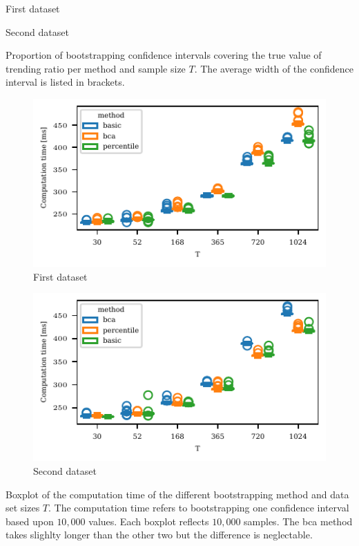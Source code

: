 \begin{table}
    \centering
    \begin{subtable}{.48\textwidth}
        
        \caption{First dataset}
    \end{subtable}\hspace{0.02\textwidth}
    \begin{subtable}{.48\textwidth}
        
        \caption{Second dataset}
    \end{subtable}
    \caption{Proportion of bootstrapping confidence intervals covering the true value of trending ratio per method and sample size $T$. The average width of the confidence interval is listed in brackets.}
    \label{tab:trending_bootstrap}
\end{table}

\begin{table}
    \centering
    \begin{subfigure}{0.48\textwidth}
        \includegraphics{plots/illustrative_examples/boxplot_comp_time_butterfly}
        \caption{First dataset}
    \end{subfigure}
    \begin{subfigure}{0.48\textwidth}
        \includegraphics{plots/illustrative_examples/boxplot_comp_time_normal}
        \caption{Second dataset}
    \end{subfigure}
    \caption{Boxplot of the computation time of the different bootstrapping method and data set sizes $T$. The computation time refers to bootstrapping one confidence interval based upon $10,000$ values. Each boxplot reflects $10,000$ samples. The \ac{bca} method takes slighlty longer than the other two but the difference is neglectable.}
    \label{fig:trending_bootstrap_time}
\end{table}



